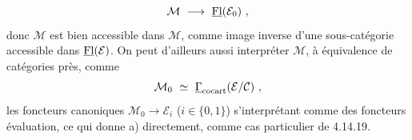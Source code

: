 \[
\mathcal{M} \ \longrightarrow \ \uFl(\mathcal{E}_0) \ ,
\]
donc $\mathcal{M}$ est bien accessible dans $\mathcal{M}$, comme image inverse d’une sous-catégorie accessible dans $\underline{\mathrm{Fl}}(\mathcal{E})$. On peut d’ailleurs aussi interpréter $\mathcal{M}$, à équivalence de catégories près, comme %
\[
\mathcal{M}_0 \ \simeq \ \uGamma_{\cocart}(\mathcal{E}/\mathcal{C}) \ ,
\]
les foncteurs canoniques $\mathcal{M}_0 \longrightarrow \mathcal{E}_i$ ($i \in \{0,1\}$) s’interprétant comme des foncteurs évaluation, ce qui donne a) directement, comme cas particulier de 4.14.19. %


